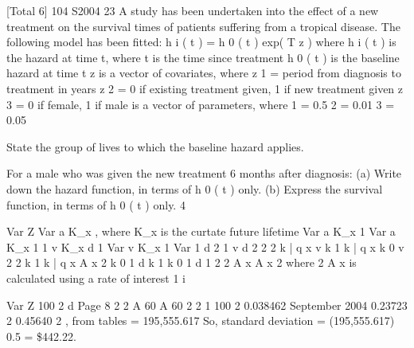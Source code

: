 \documentclass[a4paper,12pt]{article}
\begin{document}
[Total 6]
104 S2004
23
A study has been undertaken into the effect of a new treatment on the survival times
of patients suffering from a tropical disease. The following model has been fitted:
h i ( t ) = h 0 ( t ) exp(
T
z )
where h i ( t ) is the hazard at time t, where t is the time since treatment
h 0 ( t ) is the baseline hazard at time t
z is a vector of covariates, where
z 1 = period from diagnosis to treatment in years
z 2 = 0 if existing treatment given, 1 if new treatment given
z 3 = 0 if female, 1 if male
is a vector of parameters, where
1 = 0.5
2 = 0.01
3 = 0.05
\item  State the group of lives to which the baseline hazard applies.
\item  For a male who was given the new treatment 6 months after diagnosis:
(a) Write down the hazard function, in terms of h 0 ( t ) only.
(b) Express the survival function, in terms of h 0 ( t ) only.
4
\item 
Var Z
Var a K_x , where K_x is the curtate future lifetime
Var a K_x 1
Var a K_x 1
1 v K_x
d 1
Var v K_x 1
Var
1
d
2
1
v
d 2
2
2
k | q x
v
k 1
k | q x
k 0
v 2
2
k 1
k | q x
A x
2
k 0
1
d
k 1
k 0
1
d
1
2
2
A x
A x
2
where 2 A x is calculated using a rate of interest 1 i
\item 
Var Z
100 2
d
Page 8
2
2
A 60
A 60
2
2
1 %
100 2
0.038462
September 2004
0.23723
2
0.45640
2
, from tables
= 195,555.617
So, standard deviation = (195,555.617) 0.5 = \$442.22.
\end{document}
